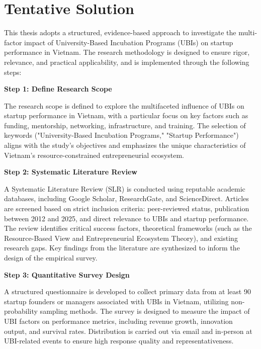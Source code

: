 \documentclass[../Main.tex]{subfiles}
\begin{document}
	\section{Tentative Solution}
	\label{section:1.3_Tentative_solution}
	This thesis adopts a structured, evidence-based approach to investigate the multi-factor impact of University-Based Incubation Programs (UBIs) on startup performance in Vietnam. The research methodology is designed to ensure rigor, relevance, and practical applicability, and is implemented through the following steps:

	\begin{center}
	\begin{minipage}[c]{0.6\textwidth}
		\vspace*{\fill}
	\textbf{Step 1: Define Research Scope}

	The research scope is defined to explore the multifaceted influence of UBIs on startup performance in Vietnam, with a particular focus on key factors such as funding, mentorship, networking, infrastructure, and training. The selection of keywords ("University-Based Incubation Programs," "Startup Performance") aligns with the study's objectives and emphasizes the unique characteristics of Vietnam's resource-constrained entrepreneurial ecosystem.

	\textbf{Step 2: Systematic Literature Review}

	A Systematic Literature Review (SLR) is conducted using reputable academic databases, including Google Scholar, ResearchGate, and ScienceDirect. Articles are screened based on strict inclusion criteria: peer-reviewed status, publication between 2012 and 2025, and direct relevance to UBIs and startup performance. The review identifies critical success factors, theoretical frameworks (such as the Resource-Based View and Entrepreneurial Ecosystem Theory), and existing research gaps. Key findings from the literature are synthesized to inform the design of the empirical survey.

	\textbf{Step 3: Quantitative Survey Design}

	A structured questionnaire is developed to collect primary data from at least 90 startup founders or managers associated with UBIs in Vietnam, utilizing non-probability sampling methods. The survey is designed to measure the impact of UBI factors on performance metrics, including revenue growth, innovation output, and survival rates. Distribution is carried out via email and in-person at UBI-related events to ensure high response quality and representativeness.


\end{minipage}
\end{center}
\end{document}
